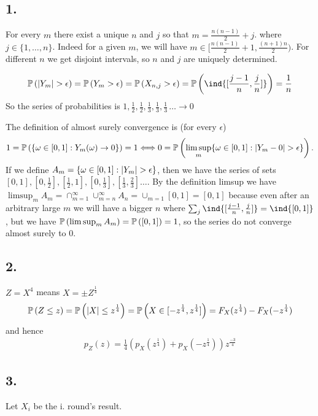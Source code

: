 \subsection*{1.}
For every $m$ there exist a unique $n$ and $j$ so that $m=\frac{n(n-1)}{2}+j$. where $j\in\{1,\ldots,n\}$. Indeed for a given $m$, we will have $m \in[\frac{n(n-1)}{2}+1, \frac{(n+1)n}{2})$. For different $n$ we get disjoint intervals, so $n$ and $j$ are uniquely determined.

\begin{gather*}
    \pr{\abs{Y_m}>\epsilon}=\pr{Y_m>\epsilon}=\pr{X_{n,j}>\epsilon}=\pr{\ind{[\frac{j-1}{n},\frac{j}{n}]}}=\frac{1}{n}
\end{gather*}
So the series of probabilities is $1, \frac{1}{2}, \frac{1}{2}, \frac{1}{3}, \frac{1}{3}, \frac{1}{3}\,\ldots \to 0$

The definition of almost surely convergence is (for every $\epsilon$) $$1=\mathbb{P}\left( \{\omega\in[0,1]:Y_m(\omega)\to0\} \right)=1\Longleftrightarrow0=\mathbb{P}\left( \limsup_m\{\omega \in [0,1]: \left\lvert Y_m-0\right\rvert>\epsilon\} \right).$$ If we define $A_m=\{\omega \in [0,1]: \left\lvert Y_m\right\rvert>\epsilon\}$, then we have the series of sets $[0,1], [0,\frac{1}{2}], [\frac{1}{2},1], [0,\frac{1}{3}], [\frac{1}{3},\frac{2}{3}]\ldots$. By the definition limsup we have $\limsup_m A_m=\cap_{m=1}^{\infty} \cup_{m=n}^{\infty}A_n=\cup_{m=1}[0,1]=[0,1]$ because even after an arbitrary large $m$ we will have a bigger $n$ where $\sum_j\ind{[\frac{j-1}{n}, \frac{j}{n}]}=\ind{[0,1]}$, but we have $\mathbb{P}\left( \limsup_m A_m \right)=\mathbb{P}\left( [0,1] \right)=1$, so the series do not converge almost surely to $0$.

\subsection*{2.}
$Z=X^4$ means $X=\pm Z^\frac{1}{4}$
\begin{gather*}
    \mathbb{P}\left( Z \le z \right)=\mathbb{P}\left( \left\lvert X\right\rvert \le z^\frac{1}{4} \right)=\mathbb{P}\left( X \in [-z^\frac{1}{4},z^\frac{1}{4}] \right)=F_{X}(z^\frac{1}{4})-F_{X}(-z^\frac{1}{4})
\end{gather*}
and hence
\begin{gather*}
    p_{Z}(z)=\frac{1}{4}(p_{X}(z^\frac{1}{4})+p_{X}(-z^\frac{1}{4}))z^\frac{-3}{4}
\end{gather*}

\subsection*{3.}
Let $X_i$ be the i. round's result. 

